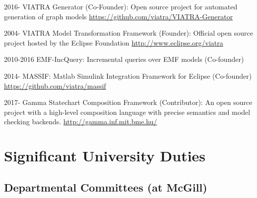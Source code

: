 \begin{yearlist}
\item[2016-] VIATRA Generator (Co-Founder): Open source project for automated generation of graph models \newline \url{https://github.com/viatra/VIATRA-Generator} 

\item[2004-] VIATRA Model Transformation Framework (Founder): Official open source project hosted by the Eclipse Foundation \newline \url{http://www.eclipse.org/viatra} 

\item[2010-2016] EMF-IncQuery: Incremental queries over EMF models (Co-founder) 

\item[2014-] MASSIF: Matlab Simulink Integration Framework for Eclipse (Co-founder) \newline 
\url{https://github.com/viatra/massif} 

\item[2017-] Gamma Statechart Composition Framework (Contributor): An open source project with a high-level composition language with precise semantics and model checking backends. \newline \url{http://gamma.inf.mit.bme.hu/} 

\end{yearlist}


\section{Significant University Duties}

\subsection{Departmental Committees (at McGill)}

